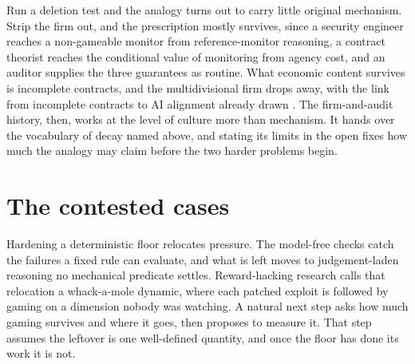 \documentclass[11pt]{article}
\begin{document}
Run a deletion test and the analogy turns out to carry little original mechanism. Strip the firm out, and the prescription mostly survives, since a security engineer reaches a non-gameable monitor from reference-monitor reasoning, a contract theorist reaches the conditional value of monitoring from agency cost, and an auditor supplies the three guarantees as routine. What economic content survives is incomplete contracts, and the multidivisional firm drops away, with the link from incomplete contracts to AI alignment already drawn \citep{hadfieldmenell2019,williamson1985}. The firm-and-audit history, then, works at the level of culture more than mechanism. It hands over the vocabulary of decay named above, and stating its limits in the open fixes how much the analogy may claim before the two harder problems begin.

\section{The contested cases}

Hardening a deterministic floor relocates pressure. The model-free checks catch the failures a fixed rule can evaluate, and what is left moves to judgement-laden reasoning no mechanical predicate settles. Reward-hacking research calls that relocation a whack-a-mole dynamic, where each patched exploit is followed by gaming on a dimension nobody was watching. A natural next step asks how much gaming survives and where it goes, then proposes to measure it. That step assumes the leftover is one well-defined quantity, and once the floor has done its work it is not.
\end{document}
